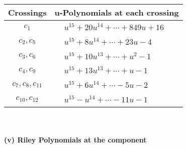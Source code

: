 \documentclass[1p]{elsarticle_modified}
\theoremstyle{definition}
\begin{document}
\begin{tabular}{m{50pt}|m{274pt}}
Crossings & \hspace{64pt}u-Polynomials at each crossing \\
\hline $$\begin{aligned}c_{1}\end{aligned}$$&$\begin{aligned}
&u^{15}+20 u^{14}+\cdots+849 u+16
\end{aligned}$\\
\hline $$\begin{aligned}c_{2},c_{5}\end{aligned}$$&$\begin{aligned}
&u^{15}+8 u^{14}+\cdots+23 u-4
\end{aligned}$\\
\hline $$\begin{aligned}c_{3},c_{6}\end{aligned}$$&$\begin{aligned}
&u^{15}+10 u^{13}+\cdots+u^2-1
\end{aligned}$\\
\hline $$\begin{aligned}c_{4},c_{9}\end{aligned}$$&$\begin{aligned}
&u^{15}+13 u^{13}+\cdots+u-1
\end{aligned}$\\
\hline $$\begin{aligned}c_{7},c_{8},c_{11}\end{aligned}$$&$\begin{aligned}
&u^{15}+6 u^{14}+\cdots-5 u-2
\end{aligned}$\\
\hline $$\begin{aligned}c_{10},c_{12}\end{aligned}$$&$\begin{aligned}
&u^{15}- u^{14}+\cdots-11 u-1
\end{aligned}$\\
\hline
\end{tabular}\\~\\
\newpage\renewcommand{\arraystretch}{1}
\flushleft \textbf{(v) Riley Polynomials at the component}\newline \\
\end{document}
